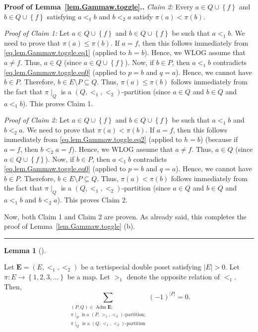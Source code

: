 \documentclass[numbers=enddot,12pt,final,onecolumn,notitlepage,abstracton]{scrartcl}%
\theoremstyle{definition}
\newtheorem{lem}[theo]{Lemma}
\newenvironment{lemma}[1][]
{\begin{lem}[#1]\begin{leftbar}}
{\end{leftbar}\end{lem}}
\newenvironment{proof}[1][Proof]{\noindent\textbf{#1.} }{\ \rule{0.5em}{0.5em}}
\let\sumnonlimits\sum
\renewcommand{\sum}{\sumnonlimits\limits}
\newcommand{\Adm}{\operatorname{Adm}}
\newcommand{\EE}{{\mathbf{E}}}
\begin{document}
\begin{proof}[Proof of Lemma~\ref{lem.Gammaw.toggle}.]
\textit{Claim 2:} Every $a\in Q\cup\left\{  f\right\}  $ and $b\in
Q\cup\left\{  f\right\}  $ satisfying $a<_{1}b$ and $b<_{2}a$ satisfy
$\pi\left(  a\right)  <\pi\left(  b\right)  $.

\textit{Proof of Claim 1:} Let $a\in Q\cup\left\{  f\right\}  $ and $b\in
Q\cup\left\{  f\right\}  $ be such that $a<_{1}b$. We need to prove that
$\pi\left(  a\right)  \leq\pi\left(  b\right)  $. If $a=f$, then this follows
immediately from \eqref{eq.lem.Gammaw.toggle.eq1} (applied to $h=b$).
Hence, we WLOG assume that $a\neq f$. Thus, $a\in Q$ (since $a\in
Q\cup\left\{  f\right\}  $). Now, if $b\in P$, then $a<_{1}b$ contradicts
\eqref{eq.lem.Gammaw.toggle.eq0} (applied to $p=b$ and $q=a$). Hence,
we cannot have $b\in P$. Therefore, $b\in E\setminus P
\subseteq Q$. Thus, $\pi\left(  a\right)  \leq\pi\left(
b\right)  $ follows immediately from the fact that $\pi\mid_{Q}$ is a $\left(
Q,<_{1},<_{2}\right)  $-partition (since $a \in Q$ and $b \in Q$ and
$a <_1 b$).
This proves Claim 1.

\textit{Proof of Claim 2:} Let $a\in Q\cup\left\{  f\right\}  $ and $b\in
Q\cup\left\{  f\right\}  $ be such that $a<_{1}b$ and $b<_{2}a$. We need to
prove that $\pi\left(  a\right)  <\pi\left(  b\right)  $. If $a=f$, then this
follows immediately from \eqref{eq.lem.Gammaw.toggle.eq2} (applied
to $h=b$) (because if $a = f$, then $b <_2 a = f$).
Hence, we WLOG assume that $a\neq f$. Thus, $a\in Q$ (since $a\in
Q\cup\left\{  f\right\}  $). Now, if $b\in P$, then $a<_{1}b$ contradicts
\eqref{eq.lem.Gammaw.toggle.eq0} (applied to $p=b$ and $q=a$). Hence,
we cannot have $b\in P$. Therefore, $b\in E\setminus P \subseteq Q$.
Thus, $\pi\left(  a\right)  <\pi\left(
b\right)  $ follows immediately from the fact that $\pi\mid_{Q}$ is a $\left(
Q,<_{1},<_{2}\right)  $-partition (since $a \in Q$ and $b \in Q$ and
$a <_1 b$ and $b <_2 a$).
This proves Claim 2.

Now, both Claim 1 and Claim 2 are proven. As already said, this
completes the proof of Lemma~\ref{lem.Gammaw.toggle} (b).
\end{proof}

\begin{lemma}
\label{lem.Gammaw.altsum}
Let $\EE = \left(E, <_1, <_2\right)$ be a tertispecial double
poset satisfying $\left|E\right| > 0$.
Let $\pi : E \to \left\{ 1, 2, 3, \ldots \right\}$ be a map.
Let $>_1$ denote the opposite relation of $<_1$. Then,
\begin{equation}
\sum_{\substack{\left(P, Q\right) \in \Adm \EE ; \\
                \pi\mid_P \text{ is a }\left(P, >_1, <_2\right)\text{-partition;} \\
                \pi\mid_Q \text{ is a }\left(Q, <_1, <_2\right)\text{-partition}}}
\left(-1\right)^{\left|P\right|}
= 0 .
\label{pf.thm.antipode.Gammaw.signrev}
\end{equation}
\end{lemma}
\end{document}
